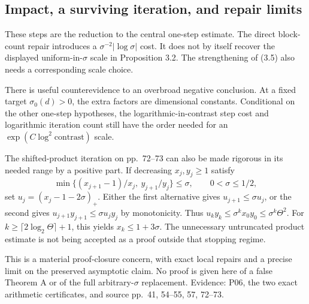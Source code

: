 \documentclass[10pt]{article}
\begin{document}
\subsection*{Impact, a surviving iteration, and repair limits}
These steps are the reduction to the central one-step estimate. The direct block-count repair introduces a \(\sigma^{-2}|\log\sigma|\) cost. It does not by itself recover the displayed uniform-in-\(\sigma\) scale in Proposition 3.2. The strengthening of (3.5) also needs a corresponding scale choice.\par
There is useful counterevidence to an overbroad negative conclusion. At a fixed target \(\sigma_0(d)>0\), the extra factors are dimensional constants. Conditional on the other one-step hypotheses, the logarithmic-in-contrast step cost and logarithmic iteration count still have the order needed for an \(\exp(C\log^2\text{contrast})\) scale.\par
The shifted-product iteration on pp. 72–73 can also be made rigorous in its needed range by a positive part. If decreasing \(x_j,y_j\ge1\) satisfy \[\min\{(x_{j+1}-1)/x_j,\ y_{j+1}/y_j\}\le\sigma,\qquad
 0<\sigma\le1/2,\] set \(u_j=(x_j-1-2\sigma)_+\). Either the first alternative gives \(u_{j+1}\le\sigma u_j\), or the second gives \(u_{j+1}y_{j+1}\le\sigma u_jy_j\) by monotonicity. Thus \(u_ky_k\le\sigma^k x_0y_0\le\sigma^k\Theta^2\). For \(k\ge\lceil2\log_2\Theta\rceil+1\), this yields \(x_k\le1+3\sigma\). The unnecessary untruncated product estimate is not being accepted as a proof outside that stopping regime.\par
This is a material proof-closure concern, with exact local repairs and a precise limit on the preserved asymptotic claim. No proof is given here of a false Theorem A or of the full arbitrary-\(\sigma\) replacement. Evidence: P06, the two exact arithmetic certificates, and source pp. 41, 54–55, 57, 72–73.\par
\end{document}
